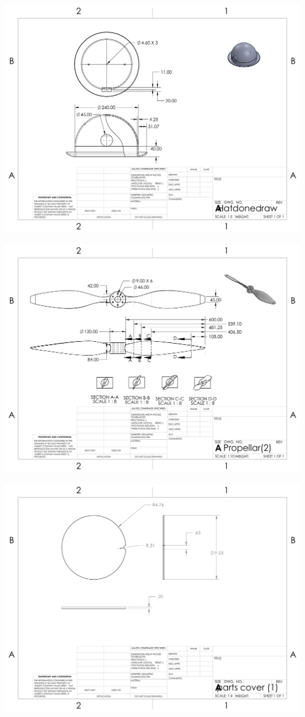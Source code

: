 \centering
\includegraphics[width=\linewidth]{root/Appendix_B/Hat_Body.pdf}

\centering
\includegraphics[width=\linewidth]{root/Appendix_B/Propellar.PDF}

\centering
\includegraphics[width=\linewidth]{root/Appendix_B/Parts_Cover.pdf}

